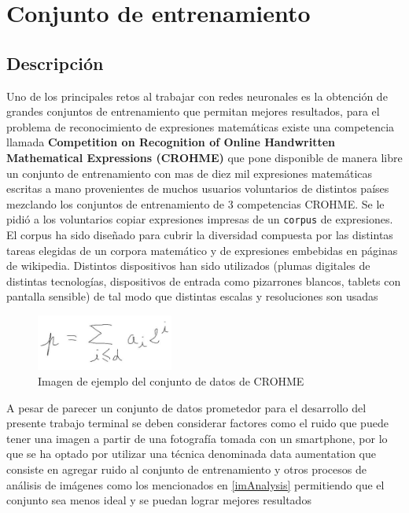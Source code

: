 \section{Conjunto de entrenamiento}
\subsection{Descripción}
Uno de los principales retos al trabajar con redes neuronales es la obtención de grandes conjuntos de entrenamiento que permitan mejores resultados, para el problema de reconocimiento de expresiones matemáticas existe una competencia llamada \textbf{Competition on Recognition of Online Handwritten Mathematical Expressions (CROHME)} que pone disponible de manera libre un conjunto de entrenamiento con mas de diez mil expresiones matemáticas escritas a mano provenientes de muchos usuarios voluntarios de distintos países mezclando los conjuntos de entrenamiento de 3 competencias CROHME. Se le pidió a los voluntarios copiar expresiones impresas de un \texttt{corpus} de expresiones. El corpus ha sido diseñado para cubrir la diversidad compuesta por las distintas tareas elegidas de un corpora matemático y de expresiones embebidas en páginas de wikipedia. Distintos dispositivos han sido utilizados (plumas digitales de distintas tecnologías, dispositivos de entrada como pizarrones blancos, tablets con pantalla sensible) de tal modo que distintas escalas y resoluciones son usadas %

\begin{figure}[h]
	\centering
	\includegraphics[width=0.4\textwidth]{capitulo5/dataset/crohme.jpg}
	\caption{Imagen de ejemplo del conjunto de datos de CROHME}
	\label{fig:crohme}
\end{figure}

A pesar de parecer un conjunto de datos prometedor para el desarrollo del presente trabajo terminal se deben considerar factores como el ruido que puede tener una imagen a partir de una fotografía tomada con un smartphone, por lo que se ha optado por utilizar una técnica denominada data aumentation que consiste en agregar ruido al conjunto de entrenamiento y otros procesos de análisis de imágenes como los mencionados en \ref{imAnalysis} permitiendo que el conjunto sea menos ideal y se puedan lograr mejores resultados 


